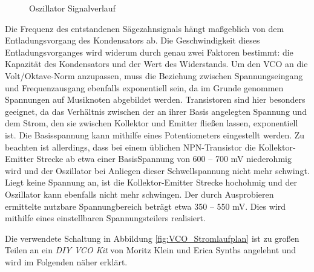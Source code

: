 \begin{figure}[h]
	\centering
	\setlength{\fboxsep}{1pt} %
	\setlength{\fboxrule}{1pt} %
	\caption{Oszillator Signalverlauf}
	\label{fig:Oszillator_Signalverlauf}
\end{figure}

\newpage

Die Frequenz des entstandenen Sägezahnsignals hängt maßgeblich von dem Entladungsvorgang des Kondensators ab.
Die Geschwindigkeit dieses Entladungsvorganges wird widerum durch genau zwei Faktoren bestimmt: die Kapazität des Kondensators und der Wert des Widerstands.
Um den VCO an die Volt/Oktave-Norm anzupassen, muss die Beziehung zwischen Spannungseingang und Frequenzausgang ebenfalls exponentiell sein, da im Grunde genommen Spannungen auf Musiknoten abgebildet werden. 
Transistoren sind hier besonders geeignet, da das Verhältnis zwischen der an ihrer Basis angelegten Spannung und dem Strom, den sie zwischen Kollektor und Emitter fließen lassen, exponentiell ist.
Die Basisspannung kann mithilfe eines Potentiometers eingestellt werden.
Zu beachten ist allerdings, dass bei einem üblichen NPN-Transistor die Kollektor-Emitter Strecke ab etwa einer BasisSpannung von 600 -- 700 mV niederohmig wird und der Oszillator bei Anliegen dieser Schwellspannung nicht mehr schwingt. 
Liegt keine Spannung an, ist die Kollektor-Emitter Strecke hochohmig und der Oszillator kann ebenfalls nicht mehr schwingen.
Der durch Ausprobieren ermittelte nutzbare Spannungbereich beträgt etwa 350 -- 550 mV.
Dies wird mithilfe eines einstellbaren Spannungsteilers realisiert. 

Die verwendete Schaltung in Abbildung \ref{fig:VCO_Stromlaufplan} ist zu großen Teilen an ein \textit{DIY VCO Kit} von Moritz Klein und Erica Synths angelehnt und wird im Folgenden näher erklärt. \cite{vco_manual}



